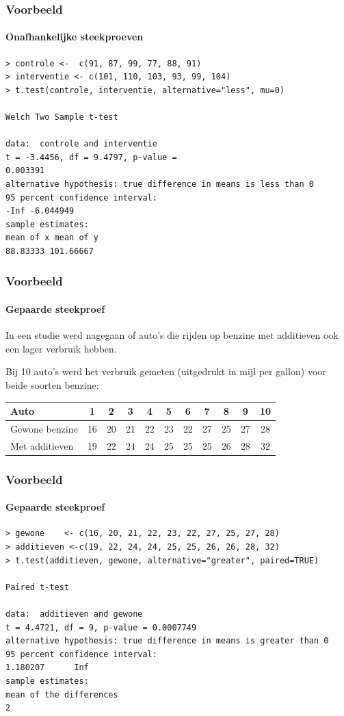 \documentclass{beamer}
\begin{document}
\begin{frame}[fragile]
  \frametitle{Voorbeeld}
  \framesubtitle{Onafhankelijke steekproeven}

\footnotesize
\begin{verbatim}
> controle <-  c(91, 87, 99, 77, 88, 91)
> interventie <- c(101, 110, 103, 93, 99, 104)
> t.test(controle, interventie, alternative="less", mu=0)

Welch Two Sample t-test

data:  controle and interventie
t = -3.4456, df = 9.4797, p-value =
0.003391
alternative hypothesis: true difference in means is less than 0
95 percent confidence interval:
-Inf -6.044949
sample estimates:
mean of x mean of y 
88.83333 101.66667
\end{verbatim}
\end{frame}


\begin{frame}
  \frametitle{Voorbeeld}
  \framesubtitle{Gepaarde steekproef}
  
  In een studie werd nagegaan of auto's die rijden op benzine met additieven ook een lager verbruik hebben.
  
  Bij 10 auto's werd het verbruik gemeten (uitgedrukt in mijl per gallon) voor beide soorten benzine:
  
  \vspace{.5cm}
  \centering
  \begin{tabular}{|l|c|c|c|c|c|c|c|c|c|c|}
  	\hline
  	Auto           & 1  & 2  & 3  & 4  & 5  & 6  & 7  & 8  & 9  & 10 \\ \hline
  	Gewone benzine & 16 & 20 & 21 & 22 & 23 & 22 & 27 & 25 & 27 & 28 \\ \hline
  	Met additieven & 19 & 22 & 24 & 24 & 25 & 25 & 25 & 26 & 28 & 32 \\ \hline
  \end{tabular} 
\end{frame}

\begin{frame}[fragile]
  \frametitle{Voorbeeld}
  \framesubtitle{Gepaarde steekproef}
  
\footnotesize
\begin{verbatim}
> gewone    <- c(16, 20, 21, 22, 23, 22, 27, 25, 27, 28)
> additieven <-c(19, 22, 24, 24, 25, 25, 26, 26, 28, 32)
> t.test(additieven, gewone, alternative="greater", paired=TRUE)

Paired t-test

data:  additieven and gewone
t = 4.4721, df = 9, p-value = 0.0007749
alternative hypothesis: true difference in means is greater than 0
95 percent confidence interval:
1.180207      Inf
sample estimates:
mean of the differences 
2
\end{verbatim}
\end{frame}
\end{document}
